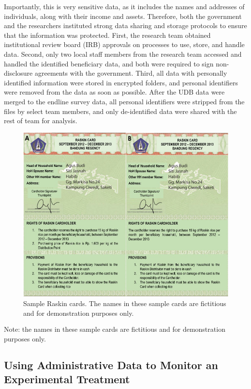 Importantly, this is very sensitive data, as it includes the names and addresses of individuals, along with their income and assets. Therefore, both the government and the researchers instituted strong data sharing and storage protocols to ensure that the information was protected. First, the research team obtained institutional review board (IRB) approvals on processes to use, store, and handle data. Second, only two local staff members from the research team accessed and handled the identified beneficiary data, and both were required to sign non-disclosure agreements with the government. Third, all data with personally identified information were stored in encrypted folders, and personal identifiers were removed from the data as soon as possible. After the UDB data were merged to the endline survey data, all personal identifiers were stripped from the files by select team members, and only de-identified data were shared with the rest of team for analysis.

\begin{figure}
\includegraphics[width=1\linewidth]{./figures/indonesiafigure1} \caption{Sample Raskin cards. The names in these sample cards are fictitious and for demonstration purposes only. }\label{fig:indonesiafigure1}
\end{figure}

Note: the names in these sample cards are fictitious and for demonstration purposes only.

\hypertarget{using-administrative-data-to-monitor-an-experimental-treatment}{%
\subsection{Using Administrative Data to Monitor an Experimental Treatment}\label{using-administrative-data-to-monitor-an-experimental-treatment}}

